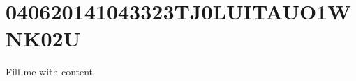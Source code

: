 \documentclass{article}
\begin{document}
\section{040620141043323TJ0LUITAUO1WNK02U}
Fill me with content
\end{document}
